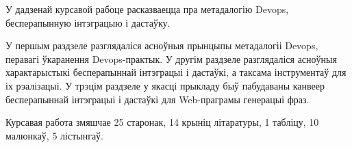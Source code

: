 \thispagestyle{empty} %

У дадзенай курсавой рабоце расказваецца пра метадалогію Devops,
бесперапынную інтэграцыю і дастаўку.

У першым раздзеле разглядаліся асноўныя прынцыпы метадалогіі Devops,
перавагі ўкаранення Devops-практык.
У другім раздзеле разглядаліся асноўныя характарыстыкі
бесперапыннай інтэграцыі і дастаўкі, а таксама інструментаў
для іх рэалізацыі.
У трэцім раздзеле у якасці прыкладу быў пабудаваны
канвеер бесперапыннай інтэграцыі і дастаўкі для
Web-праграмы генерацыі фраз.

Курсавая работа змяшчае 25 старонак, 14 крыніц літаратуры,
1 табліцу, 10 малюнкаў, 5\,\,лістынгаў.









